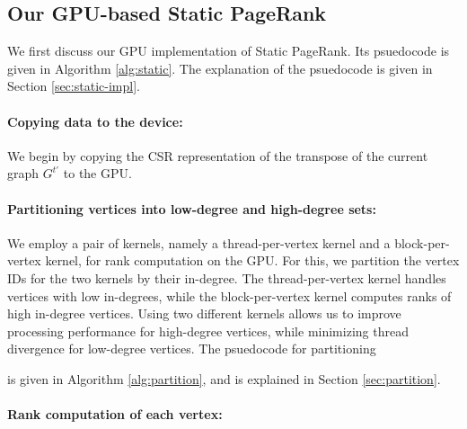 \subsection{Our GPU-based Static PageRank}
\label{sec:static}

We first discuss our GPU implementation of Static PageRank. Its psuedocode is given in Algorithm \ref{alg:static}. The explanation of the psuedocode is given in Section \ref{sec:static-impl}.

\paragraph{Copying data to the device:}

We begin by copying the CSR representation of the transpose of the current graph $G^{t'}$ to the GPU.

\paragraph{Partitioning vertices into low-degree and high-degree sets:}

We employ a pair of kernels, namely a thread-per-vertex kernel and a block-per-vertex kernel, for rank computation on the GPU. For this, we partition the vertex IDs for the two kernels by their in-degree. The thread-per-vertex kernel handles vertices with low in-degrees, while the block-per-vertex kernel computes ranks of high in-degree vertices. Using two different kernels allows us to improve processing performance for high-degree vertices, while minimizing thread divergence for low-degree vertices. The psuedocode for partitioning is given in Algorithm \ref{alg:partition}, and is explained in Section \ref{sec:partition}.

\paragraph{Rank computation of each vertex:}


